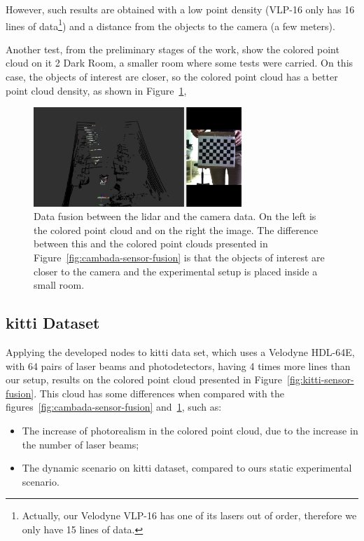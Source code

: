 However, such results are obtained with a low point density (VLP-16 only has 16 lines of data\footnote{Actually, our Velodyne VLP-16 has one of its lasers out of order, therefore we only have 15 lines of data.}) and a distance from the objects to the camera (a few meters). 

Another test, from the preliminary stages of the work, show the colored point cloud on \ac{it} 2 Dark Room, a smaller room where some tests were carried. On this case, the objects of interest are closer, so the colored point cloud has a better point cloud density, as shown in Figure~\ref{fig:dark-room-sensor-fusion}, 

\begin{figure}[!ht]
	\centering
	\includegraphics[width=0.7\textwidth]{img/sensor_fusion/dark-room-sensor-fusion.png}
\caption[Example of preliminar data fusion on \acs{it} 2 Dark Room.]{Data fusion between the \ac{lidar} and the camera data. On the left is the colored point cloud and on the right the image. The difference between this and the colored point clouds presented in Figure~\ref{fig:cambada-sensor-fusion} is that the objects of interest are closer to the camera and the experimental setup is placed inside a small room.}
	\label{fig:dark-room-sensor-fusion}
\end{figure}

\subsection{\acs{kitti} Dataset}
\label{subsec:sensor-fusion:kitti}
Applying the developed nodes to \ac{kitti} data set, which uses a Velodyne HDL-64E, with 64 pairs of laser beams and photodetectors, having 4 times more lines than our setup, results on the colored point cloud presented in Figure~\ref{fig:kitti-sensor-fusion}. This cloud has some differences when compared with the figures~\ref{fig:cambada-sensor-fusion} and~\ref{fig:dark-room-sensor-fusion}, such as:

\begin{itemize}
	\item The increase of photorealism in the colored point cloud, due to the increase in the number of laser beams;
	\item The dynamic scenario on \ac{kitti} dataset, compared to ours static experimental scenario.
\end{itemize}

